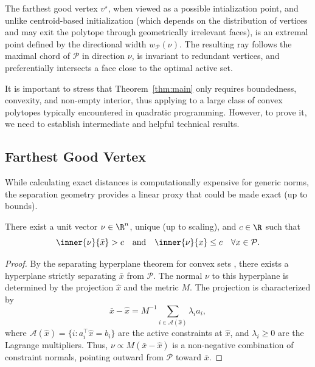 The farthest good vertex $v^\star$, when viewed as a possible intialization point, and unlike centroid-based initialization (which depends on the distribution of vertices and may exit the polytope through geometrically irrelevant faces), is an extremal point defined by the directional width $w_{\mathcal P}(\nu)$. The resulting ray follows the maximal chord of $\mathcal P$ in direction $\nu$, is invariant to redundant vertices, and preferentially intersects a face close to the optimal active set.


It is important to stress that Theorem~\ref{thm:main} only requires boundedness, convexity, and non-empty interior, thus applying to a large class of convex polytopes typically encountered in quadratic programming. However, to prove it, we need to establish intermediate and helpful technical results. 

\subsection{Farthest Good Vertex}
While calculating exact distances is computationally expensive for generic norms, the separation geometry provides a linear proxy that could be made exact (up to bounds).
\begin{lemma}\label{lem:separation_unified}
There exist a unit vector $\nu \in \R^n$, unique (up to scaling), and $c \in \R$ such that
\begin{equation}\label{eq:separation_unified}
\inner{\nu}{\bar{x}} > c \quad \text{and} \quad \inner{\nu}{x} \leq c \quad \forall x \in \mathcal{P}.
\end{equation}
\end{lemma}

\begin{proof}
By the separating hyperplane theorem for convex sets \cite{conv_book_1}, there exists a hyperplane strictly separating $\bar{x}$ from $\mathcal{P}$. The normal $\nu$ to this hyperplane is determined by the projection $\hat{x}$ and the metric $M$. The projection is characterized by
\begin{equation*}
\bar{x} - \hat{x} = M^{-1} \sum_{i \in \mathcal{A}(\hat{x})} \lambda_i a_i,
\end{equation*}
where $\mathcal{A}(\hat{x}) = \{i : a_i^\top \hat{x} = b_i\}$ are the active constraints at $\hat{x}$, and $\lambda_i \geq 0$ are the Lagrange multipliers. Thus, $\nu \propto M(\bar{x} - \hat{x})$ is a non-negative combination of constraint normals, pointing outward from $\mathcal{P}$ toward $\bar{x}$.
\end{proof}



